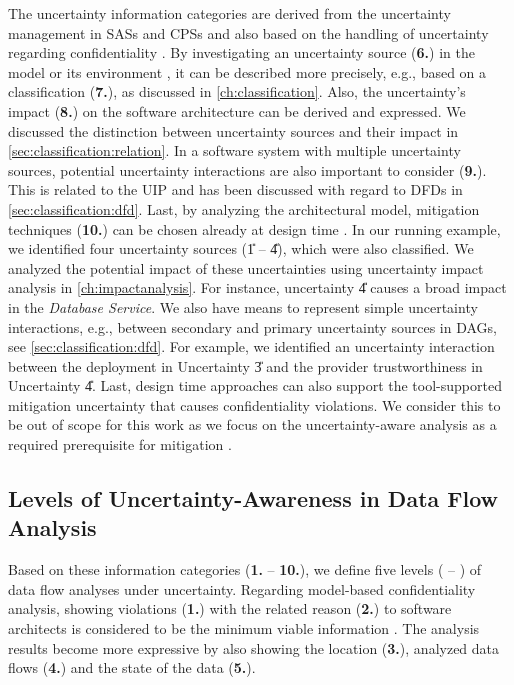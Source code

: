 The uncertainty information categories are derived from the uncertainty management in \acfp{SAS} \cite{hezavehi_uncertainty_2021} and \acfp{CPS} \cite{acosta_uncertainty_2022} and also based on the handling of uncertainty regarding confidentiality \cite{hahner_classification_2023}.
By investigating an uncertainty source (\textbf{6.}) in the model or its environment \cite{acosta_uncertainty_2022}, it can be described more precisely, e.g., based on a classification (\textbf{7.}), as discussed in \autoref{ch:classification}.
Also, the uncertainty's impact (\textbf{8.}) on the software architecture can be derived and expressed.
We discussed the distinction between uncertainty sources and their impact in \autoref{sec:classification:relation}.
In a software system with multiple uncertainty sources, potential uncertainty interactions are also important to consider (\textbf{9.}).
This is related to the \acf{UIP} and has been discussed with regard to \acp{DFD} in \autoref{sec:classification:dfd}.
Last, by analyzing the architectural model, mitigation techniques (\textbf{10.}) can be chosen already at design time \cite{hezavehi_uncertainty_2021}.
In our running example, we identified four uncertainty sources (\U{1} -- \U{4}), which were also classified.
We analyzed the potential impact of these uncertainties using uncertainty impact analysis in \autoref{ch:impactanalysis}.
For instance, uncertainty \U{4} causes a broad impact in the \emph{Database Service}.
We also have means to represent simple uncertainty interactions, e.g., between secondary and primary uncertainty sources in \acp{DAG}, see \autoref{sec:classification:dfd}.
For example, we identified an uncertainty interaction between the deployment in Uncertainty \U{3} and the provider trustworthiness in Uncertainty \U{4}.
Last, design time approaches can also support the tool-supported mitigation uncertainty that causes confidentiality violations.
We consider this to be out of scope for this work as we focus on the uncertainty-aware analysis as a required prerequisite for mitigation \cite{weyns_introduction_2020}.


\subsection{Levels of Uncertainty-Awareness in Data Flow Analysis}

Based on these information categories (\textbf{1.} -- \textbf{10.}), we define five levels ( -- ) of data flow analyses under uncertainty.
Regarding model-based confidentiality analysis, showing violations (\textbf{1.}) with the related reason (\textbf{2.}) to software architects is considered to be the minimum viable information \cite{hahner_modeling_2021}.
The analysis results become more expressive by also showing the location (\textbf{3.}), analyzed data flows (\textbf{4.}) and the state of the data (\textbf{5.}).


